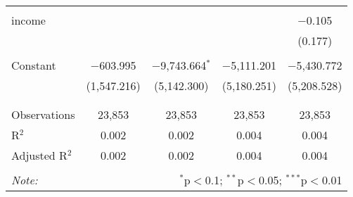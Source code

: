 \begin{table}[!htbp]
\begin{tabular}{@{\extracolsep{-5pt}}lcccc}
  & & & & \\ 
 income &  &  &  & $-$0.105 \\ 
  &  &  &  & (0.177) \\ 
  & & & & \\ 
 Constant & $-$603.995 & $-$9,743.664$^{*}$ & $-$5,111.201 & $-$5,430.772 \\ 
  & (1,547.216) & (5,142.300) & (5,180.251) & (5,208.528) \\ 
  & & & & \\ 
\hline \\[-1.8ex] 
Observations & 23,853 & 23,853 & 23,853 & 23,853 \\ 
R$^{2}$ & 0.002 & 0.002 & 0.004 & 0.004 \\ 
Adjusted R$^{2}$ & 0.002 & 0.002 & 0.004 & 0.004 \\ 
\hline 
\hline \\[-1.8ex] 
\textit{Note:}  & \multicolumn{4}{r}{$^{*}$p$<$0.1; $^{**}$p$<$0.05; $^{***}$p$<$0.01} \\ 
\end{tabular} 
\end{table} 
